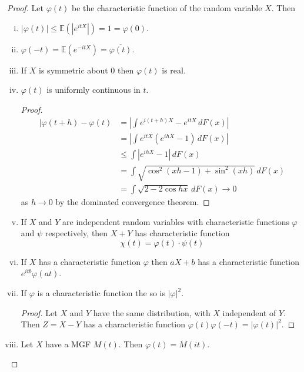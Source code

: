 \documentclass[10pt, oneside, reqno]{amsart}
\theoremstyle{plain}%
\theoremstyle{definition}
\theoremstyle{remark}
\renewcommand{\phi}{\varphi}
\newcommand{\E}{\mathbb{E}}
\begin{document}
\begin{proof}
    Let $\phi(t)$ be the characteristic function of the random variable $X$.  Then 
    \begin{enumerate}[(i)]
        \item  $| \phi(t) | \leq \E(|e^{itX}|) = 1 = \phi(0).$ 
        \item $\phi(-t) = \E(e^{-itX}) = \overline{ \phi(t)}.$
        \item If $X$ is symmetric about 0 then $\phi(t)$ is real. 
        \item $\phi(t)$ is uniformly continuous in $t$.  \begin{proof}
            \begin{align*}
                |\phi(t+h) - \phi(t) &= \left| \int e^{i(t+h)X} - e^{itX} \, dF(x) \right| \\
                            &= \left| \int e^{itX}(e^{ihX} - 1) \, dF(x) \right| \\ 
                            &\leq \int \left| e^{ihX} - 1 \right|\, dF(x) \\
                            & = \int \sqrt{\cos^2(xh - 1) + \sin^2(xh)} \, dF(x) \\
                            &= \int\sqrt{2 - 2\cos hx} \, dF(x) \rightarrow 0
            \end{align*} as $h \rightarrow 0$ by the dominated convergence theorem.
        \end{proof}
        \item If $X$ and $Y$ are independent random variables with characteristic functions $\phi$ and $\psi$ respectively, then $X + Y$ has characteristic function \[
            \chi(t) = \phi(t) \cdot \psi(t)
        \]
        \item If $X$ has a characteristic function $\phi$ then $aX + b$ has a characteristic function $e^{itb} \phi(at)$.
        \item If $\phi$ is a characteristic function the so is $| \phi |^2$.  
        \begin{proof}
            Let $X$ and $Y$ have the same distribution, with $X$ independent of $Y$.  Then $Z = X-Y$ has a characteristic function $\phi(t) \phi(-t) = |\phi(t)|^2$.
        \end{proof}
        \item Let $X$ have a MGF $M(t)$.  Then $\phi(t) = M(it)$.
    \end{enumerate}
\end{proof}
\end{document}
